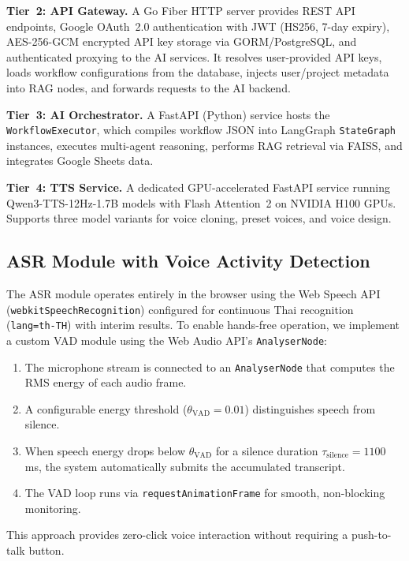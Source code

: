 \documentclass[10pt, a4paper, twocolumn]{article}
\begin{document}
\noindent\textbf{Tier~2: API Gateway.}
A Go Fiber HTTP server provides REST API endpoints, Google OAuth~2.0 authentication with JWT (HS256, 7-day expiry), AES-256-GCM encrypted API key storage via GORM/PostgreSQL, and authenticated proxying to the AI services.
It resolves user-provided API keys, loads workflow configurations from the database, injects user/project metadata into RAG nodes, and forwards requests to the AI backend.

\noindent\textbf{Tier~3: AI Orchestrator.}
A FastAPI (Python) service hosts the \texttt{WorkflowExecutor}, which compiles workflow JSON into LangGraph \texttt{StateGraph} instances, executes multi-agent reasoning, performs RAG retrieval via FAISS, and integrates Google Sheets data.

\noindent\textbf{Tier~4: TTS Service.}
A dedicated GPU-accelerated FastAPI service running Qwen3-TTS-12Hz-1.7B models with Flash Attention~2 on NVIDIA H100 GPUs.
Supports three model variants for voice cloning, preset voices, and voice design.

\subsection{ASR Module with Voice Activity Detection}

The ASR module operates entirely in the browser using the Web Speech API (\texttt{webkitSpeechRecognition}) configured for continuous Thai recognition (\texttt{lang=th-TH}) with interim results.
To enable hands-free operation, we implement a custom VAD module using the Web Audio API's \texttt{AnalyserNode}:

\begin{enumerate}[label=\arabic*.]
    \item The microphone stream is connected to an \texttt{AnalyserNode} that computes the RMS energy of each audio frame.
    \item A configurable energy threshold ($\theta_\text{VAD} = 0.01$) distinguishes speech from silence.
    \item When speech energy drops below $\theta_\text{VAD}$ for a silence duration $\tau_\text{silence} = 1100$\,ms, the system automatically submits the accumulated transcript.
    \item The VAD loop runs via \texttt{requestAnimationFrame} for smooth, non-blocking monitoring.
\end{enumerate}

\noindent This approach provides zero-click voice interaction without requiring a push-to-talk button.
\end{document}
